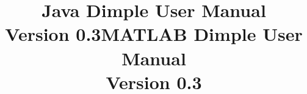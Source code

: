 \documentclass[11pt, oneside]{article}   	%
\title{\huge \bfseries Java Dimple User Manual \\ \normalfont \large Version 0.3}
\title{\huge \bfseries MATLAB Dimple User Manual \\ \normalfont \large Version 0.3}
\newif\ifmatlab
\begin{document}
\maketitle


\clearpage
\setcounter{tocdepth}{5}				%
\tableofcontents

\clearpage







\begin{appendices}

\ifmatlab

\fi
\end{appendices}
\end{document}
